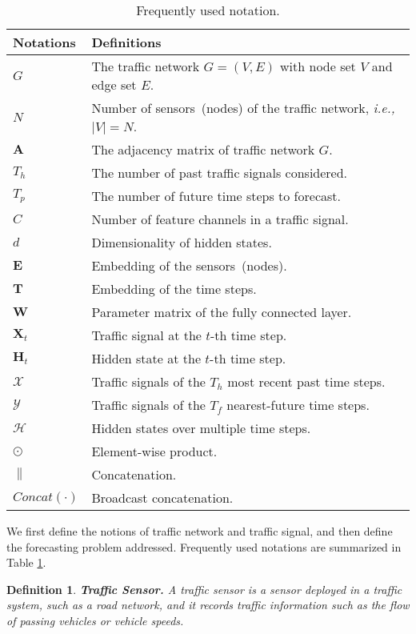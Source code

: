 \documentclass[sigconf, nonacm]{acmart}
\def\b#1{\mathbf{#1}}
\newcommand{\ie}{\textit{i.e.,}\xspace}
\newtheorem{definition}{Definition}
\begin{document}
\begin{table}
\caption{Frequently used notation. }
    \label{tab:notations}
    \begin{tabular}{m{1.3cm}<{\centering}|m{6.3cm}}
      \toprule
      \textbf{Notations} & \textbf{Definitions}\\
       \midrule
$G$ & The traffic network $G=(V, E)$ with node set $V$ and edge set $E$. \\
      $N$ & Number of sensors~(nodes) of the traffic network, \ie $|V|=N$. \\
      $\b{A}$ & The adjacency matrix of traffic network $G$. \\
      $T_h$ & The number of past traffic signals considered. \\
      $T_p$ & The number of future time steps to forecast. \\
      $C$ &  Number of feature channels in a traffic signal. \\
      $d$ & Dimensionality of hidden states.\\
      $\mathbf{E}$ & Embedding of the sensors~(nodes).\\
      $\mathbf{T}$ & Embedding of the time steps.\\
      $\mathbf{W}$ & Parameter matrix of the fully connected layer.\\
      $\mathbf{X}_t$ & Traffic signal at the $t$-th time step. \\
      $\mathbf{H}_t$ & Hidden state at the $t$-th time step. \\
      $\mathcal{X}$ & Traffic signals of the $T_h$ most recent past time steps. \\
      $\mathcal{Y}$ & Traffic signals of the $T_f$ nearest-future time steps. \\
      $\mathcal{H}$ & Hidden states over multiple time steps.\\
      $\odot$ & Element-wise product.\\
      $\parallel$ & Concatenation.\\
      $\mathit{Concat}(\cdot)$ & Broadcast concatenation.\\
      \bottomrule
    \end{tabular}
  \end{table}
\label{Section3}
We first define the notions of traffic network and traffic signal, and then define the forecasting problem addressed. 
Frequently used notations are summarized in Table \ref{tab:notations}.
\begin{definition}
\textbf{Traffic Sensor.} 
A traffic sensor is a sensor deployed in a traffic system, such as a road network, and it records traffic information such as the flow of passing vehicles or vehicle speeds.
\end{definition}
\end{document}
